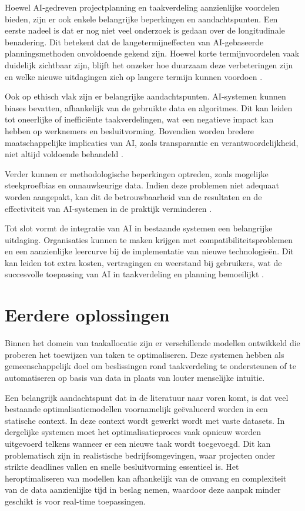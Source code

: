 Hoewel AI-gedreven projectplanning en taakverdeling aanzienlijke voordelen bieden, zijn er ook enkele belangrijke beperkingen en aandachtspunten. Een eerste nadeel is dat er nog niet veel onderzoek is gedaan over de longitudinale benadering. Dit betekent dat de langetermijneffecten van AI-gebaseerde planningsmethoden onvoldoende gekend zijn. Hoewel korte termijnvoordelen vaak duidelijk zichtbaar zijn, blijft het onzeker hoe duurzaam deze verbeteringen zijn en welke nieuwe uitdagingen zich op langere termijn kunnen voordoen \autocite{Saha_2025}.

Ook op ethisch vlak zijn er belangrijke aandachtspunten. AI-systemen kunnen biases bevatten, afhankelijk van de gebruikte data en algoritmes. Dit kan leiden tot oneerlijke of inefficiënte taakverdelingen, wat een negatieve impact kan hebben op werknemers en besluitvorming. Bovendien worden bredere maatschappelijke implicaties van AI, zoals transparantie en verantwoordelijkheid, niet altijd voldoende behandeld \autocite{Saha_2025}.

Verder kunnen er methodologische beperkingen optreden, zoals mogelijke steekproefbias en onnauwkeurige data. Indien deze problemen niet adequaat worden aangepakt, kan dit de betrouwbaarheid van de resultaten en de effectiviteit van AI-systemen in de praktijk verminderen \autocite{Saha_2025}.

Tot slot vormt de integratie van AI in bestaande systemen een belangrijke uitdaging. Organisaties kunnen te maken krijgen met compatibiliteitsproblemen en een aanzienlijke leercurve bij de implementatie van nieuwe technologieën. Dit kan leiden tot extra kosten, vertragingen en weerstand bij gebruikers, wat de succesvolle toepassing van AI in taakverdeling en planning bemoeilijkt \autocite{Saha_2025}.

\section{Eerdere oplossingen}
\label{ch:een-eerdere-oplossing}
\vspace{1em}Binnen het domein van taakallocatie zijn er verschillende modellen ontwikkeld die proberen het toewijzen van taken te optimaliseren. Deze systemen hebben als gemeenschappelijk doel om beslissingen rond taakverdeling te ondersteunen of te automatiseren op basis van data in plaats van louter menselijke intuïtie.

Een belangrijk aandachtspunt dat in de literatuur naar voren komt, is dat veel bestaande optimalisatiemodellen voornamelijk geëvalueerd worden in een statische context. In deze context wordt gewerkt wordt met vaste datasets. In dergelijke systemen moet het optimalisatieproces vaak opnieuw worden uitgevoerd telkens wanneer er een nieuwe taak wordt toegevoegd. Dit kan problematisch zijn in realistische bedrijfsomgevingen, waar projecten onder strikte deadlines vallen en snelle besluitvorming essentieel is. Het heroptimaliseren van modellen kan afhankelijk van de omvang en complexiteit van de data aanzienlijke tijd in beslag nemen, waardoor deze aanpak minder geschikt is voor real-time toepassingen.

